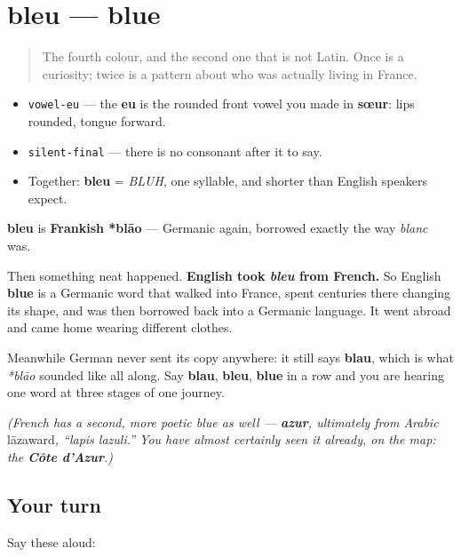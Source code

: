 \section[bleu]{bleu — blue}

\label{lesson:FR-C13-bleu}



\begin{quote}
The fourth colour, and the second one that is not Latin. Once is a curiosity; twice is a pattern about who was actually living in France.
\end{quote}

\begin{sounds}
\begin{itemize}
\raggedright
  \item \texttt{vowel-eu} — the \textbf{eu} is the rounded front vowel you made in \textbf{sœur}: lips rounded, tongue forward.
  \item \texttt{silent-final} — there is no consonant after it to say.
  \item Together: \textbf{bleu} = \emph{BLUH}, one syllable, and shorter than English speakers expect.
\end{itemize}
\end{sounds}

\begin{cousinweb}
\textbf{bleu} is \textbf{Frankish *blāo} — Germanic again, borrowed exactly the way \emph{blanc} was.

Then something neat happened. \textbf{English took \emph{bleu} from French.} So English \textbf{blue} is a Germanic word that walked into France, spent centuries there changing its shape, and was then borrowed back into a Germanic language. It went abroad and came home wearing different clothes.

Meanwhile German never sent its copy anywhere: it still says \textbf{blau}, which is what \emph{*blāo} sounded like all along. Say \textbf{blau}, \textbf{bleu}, \textbf{blue} in a row and you are hearing one word at three stages of one journey.

\emph{(French has a second, more poetic blue as well — \textbf{azur}, ultimately from Arabic }lāzaward\emph{, \textquotedblleft{}lapis lazuli.\textquotedblright{} You have almost certainly seen it already, on the map: the \textbf{Côte d'Azur}.)}
\end{cousinweb}

\subsection*{Your turn}
Say these aloud:

